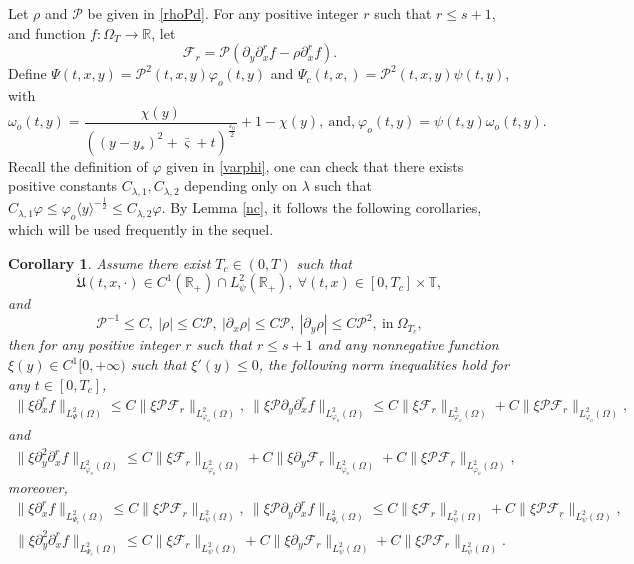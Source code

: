 \documentclass{amsart}
\numberwithin{equation}{section}
\newtheorem{corollary}{Corollary}[section]
\newcommand\y{{{\langle y \rangle}}}
\begin{document}
Let $\rho$ and $\mathcal{P}$ be given in \eqref{rhoPd}. For any positive integer $r$ such that $r\leq s+1$, and function $f:\Omega_{T}\to\mathbb{R}$, let $$\mathcal{F}_{r}=\mathcal{P}(\partial_{y}\partial_{x}^{r}f-\rho\partial_{x}^{r}f).$$
Define $\Psi(t,x,y)=\mathcal{P}^{2}(t,x,y)\varphi_{o}(t,y)$ and $\Psi_{c}(t,x,)=\mathcal{P}^{2}(t,x,y)\psi(t,y)$, with
$$\omega_{o}(t,y)=\frac{\chi(y)}{((y-y_{*})^{2}+\bar{\varsigma}+t)^{\frac{\varepsilon_{0}}{2}}}+1-\chi(y),~\text{and,}~\varphi_{o}(t,y)=\psi(t,y)\omega_{o}(t,y).$$
Recall the definition of $\varphi$ given in \eqref{varphi}, one can check that there exists positive constants $C_{\lambda,1}, C_{\lambda,2}$ depending only on $\lambda$ such that $C_{\lambda,1}\varphi\leq\varphi_{o}\y^{-\frac{1}{2}}\leq C_{\lambda,2}\varphi$.
By Lemma \ref{nc}, it follows the following corollaries, which will be used frequently in the sequel.
\begin{corollary}\label{ncC2}
Assume there exist $T_{c}\in(0,T)$ such that
$$\dot{\mathfrak{U}}(t,x,\cdot)\in C^{1}(\mathbb{R}_{+})\cap L_{\psi}^{2}(\mathbb{R}_{+}),~\forall (t,x)\in[0,T_{c}]\times\mathbb{T},$$
and
$$\mathcal{P}^{-1}\leq C,~|\rho|\leq C\mathcal{P},~|\partial_{x}\rho|\leq C\mathcal{P},~|\partial_{y}\rho|\leq C\mathcal{P}^{2},~\text{in}~ \Omega_{T_{c}},$$
then for any positive integer $r$ such that $r\leq s+1$ and any nonnegative function $\xi(y)\in C^{1}[0,+\infty)$ such that $\xi'(y)\leq0$, the following norm inequalities hold for any $t\in[0,T_{c}]$,
\begin{align}\label{ncc21}
\|\xi\partial_{x}^{r}f\|_{L_{\Psi}^{2}(\Omega)}
\leq C\|\xi\mathcal{P}\mathcal{F}_{r}\|_{L_{\varphi_{o}}^{2}(\Omega)},~
\|\xi\mathcal{P}\partial_{y}\partial_{x}^{r}f\|_{L_{\varphi_{o}}^{2}(\Omega)}
\leq C\|\xi\mathcal{F}_{r}\|_{L_{\varphi_{o}}^{2}(\Omega)}
    +C\|\xi\mathcal{P}\mathcal{F}_{r}\|_{L_{\varphi_{o}}^{2}(\Omega)},
\end{align}
and
\begin{align}\label{ncc22}
\|\xi\partial_{y}^{2}\partial_{x}^{r}f\|_{L_{\varphi_{o}}^{2}(\Omega)}
\leq C\|\xi\mathcal{F}_{r}\|_{L_{\varphi_{o}}^{2}(\Omega)}
    +C\|\xi\partial_{y}\mathcal{F}_{r}\|_{L_{\varphi_{o}}^{2}(\Omega)}
    +C\|\xi\mathcal{P}\mathcal{F}_{r}\|_{L_{\varphi_{o}}^{2}(\Omega)},
\end{align}
moreover,
\begin{align}\label{ncc23}
\|\xi\partial_{x}^{r}f\|_{L_{\Psi_{c}}^{2}(\Omega)}
\leq C\|\xi\mathcal{P}\mathcal{F}_{r}\|_{L_{\psi}^{2}(\Omega)},~
\|\xi\mathcal{P}\partial_{y}\partial_{x}^{r}f\|_{L_{\Psi_{c}}^{2}(\Omega)}
\leq C\|\xi\mathcal{F}_{r}\|_{L_{\psi}^{2}(\Omega)}
    +C\|\xi\mathcal{P}\mathcal{F}_{r}\|_{L_{\psi}^{2}(\Omega)},
\end{align}
\begin{align}\label{ncc24}
\|\xi\partial_{y}^{2}\partial_{x}^{r}f\|_{L_{\Psi_{c}}^{2}(\Omega)}
\leq C\|\xi\mathcal{F}_{r}\|_{L_{\psi}^{2}(\Omega)}
    +C\|\xi\partial_{y}\mathcal{F}_{r}\|_{L_{\psi}^{2}(\Omega)}
    +C\|\xi\mathcal{P}\mathcal{F}_{r}\|_{L_{\psi}^{2}(\Omega)}.
\end{align}
\end{corollary}
\end{document}
